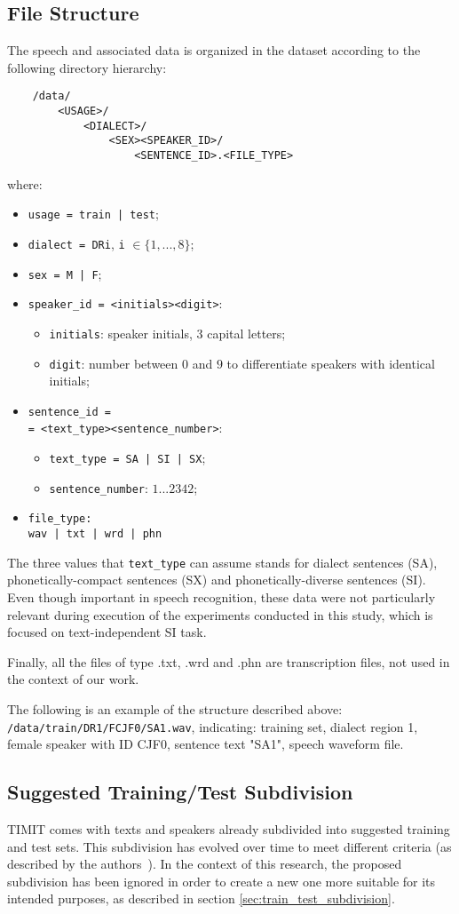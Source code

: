 \subsection{File Structure}
The speech and associated data is organized in the dataset according to the following directory hierarchy:
\begin{verbatim}
	/data/
		<USAGE>/
			<DIALECT>/
				<SEX><SPEAKER_ID>/
					<SENTENCE_ID>.<FILE_TYPE>
\end{verbatim}
where:
\begin{itemize}
	\item \verb!usage = train | test!;
	\item \verb|dialect = DRi|, \verb*|i| $\in \{1, ..., 8\}$;
	\item \verb!sex = M | F!;
	\item \verb|speaker_id = <initials><digit>|:
	\begin{itemize}
		\item \verb|initials|: speaker initials, 3 capital letters;
		\item \verb|digit|: number between $0$ and $9$ to differentiate speakers with identical initials;
	\end{itemize}
	\item \verb|sentence_id =| \\ \verb|= <text_type><sentence_number>|:
	\begin{itemize}
		\item \verb!text_type = SA | SI | SX!;
		\item \verb|sentence_number|: $1 ... 2342$;
	\end{itemize}
	\item \verb!file_type:! \\ \quad \verb!wav | txt | wrd | phn!
\end{itemize}
The three values that \verb|text_type| can assume stands for dialect sentences (SA), phonetically-compact sentences (SX) and phonetically-diverse sentences (SI). Even though important in speech recognition, these data were not particularly relevant during execution of the experiments conducted in this study, which is focused on text-independent SI task.

Finally, all the files of type .txt, .wrd and .phn are transcription files, not used in the context of our work.

The following is an example of the structure described above: \verb*|/data/train/DR1/FCJF0/SA1.wav|, indicating: training set, dialect region 1, female speaker with ID CJF0, sentence text "SA1", speech waveform file.

\subsection{Suggested Training/Test Subdivision}
TIMIT comes with texts and speakers already subdivided into suggested training and test sets. This subdivision has evolved over time to meet different criteria (as described by the authors~\cite[20]{garofolo:timit}). In the context of this research, the proposed subdivision has been ignored in order to create a new one more suitable for its intended purposes, as described in section \vref{sec:train_test_subdivision}.